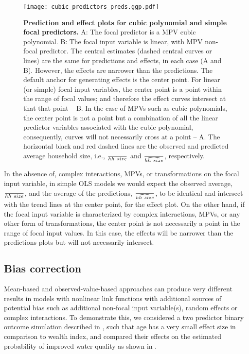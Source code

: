 \begin{figure}
\begin{center}
\texttt{[image: cubic\_predictors\_preds.ggp.pdf]}
\end{center}
\caption{{\bf Prediction and effect plots for cubic polynomial and simple focal predictors.} A: The focal predictor is a MPV cubic polynomial. B: The focal input variable is linear, with MPV non-focal predictor. The central estimates (dashed central curves or lines) are the same for predictions and effects, in each case (A and B). However, the effects are narrower than the predictions. The default anchor for generating effects is the center point. For linear (or simple) focal input variables, the center point is a point within the range of focal values; and therefore the effect curves intersect at that that point -- B. In the case of MPVs such as cubic polynomials, the center point is not a point but a combination of all the linear predictor variables associated with the cubic polynomial, consequently, curves will not necessarily cross at a point -- A. The horizontal black and red dashed lines are the observed and predicted average household size, i.e., $\over{hh~size}$ and $\over{\widehat{hh~size}}$, respectively.}
\label{fig:pred_cubic_plots}
\end{figure}

In the absence of, complex interactions, MPVs, or transformations on the focal input variable, in simple OLS models we would expect the observed average, $\over{hh~size}$, and the average of the predictions, $\over{\widehat{hh~size}}$, to be identical and intersect with the trend lines at the center point, for the effect plot. On the other hand, if the focal input variable is characterized by complex interactions, MPVs, or any other form of transformations, the center point is not necessarily a point in the range of focal input values. In this case, the effects will be narrower than the predictions plots but will not necessarily intersect. 


\subsection{Bias correction}

Mean-based and observed-value-based approaches can produce very different results in models with nonlinear link functions with additional sources of potential bias such as additional non-focal input variable(s), random effects or complex interactions. To demonstrate this, we considered a two predictor binary outcome simulation described in , such that age has a very small effect size in comparison to wealth index, and compared their effects on the estimated probability of improved water quality as shown in . 

